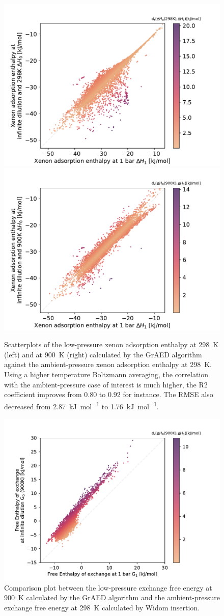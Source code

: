 \documentclass[main]{subfiles}
\begin{document}
\begin{figure}[ht]
\centering
  \includegraphics[width=0.48\linewidth]{figures/4-ml/SI_figure/Scatterplot_H1_H0.pdf}
  \includegraphics[width=0.48\linewidth]{figures/4-ml/SI_figure/Scatterplot_H1_H900K.pdf}
  \caption{Scatterplots of the low-pressure xenon adsorption enthalpy at \SI{298}{\kelvin} (left) and at \SI{900}{\kelvin} (right) calculated by the GrAED algorithm against the ambient-pressure xenon adsorption enthalpy at \SI{298}{\kelvin}. Using a higher temperature Boltzmann averaging, the correlation with the ambient-pressure case of interest is much higher, the R2 coefficient improves from $0.80$ to $0.92$ for instance. The RMSE also decreased from \SI{2.87}{\kilo\joule\per\mole} to \SI{1.76}{\kilo\joule\per\mole}. }\label{fgr:H_900K}
\end{figure}

\begin{figure}[ht]
\centering
  \includegraphics[width=0.70\linewidth]{figures/4-ml/SI_figure/Scatterplot_G1_G900K.pdf}
  \caption{Comparison plot between the low-pressure exchange free energy at \SI{900}{\kelvin} calculated by the GrAED algorithm and the ambient-pressure exchange free energy at \SI{298}{\kelvin} calculated by Widom insertion. }\label{fgr:G_900K}
\end{figure}
\end{document}
